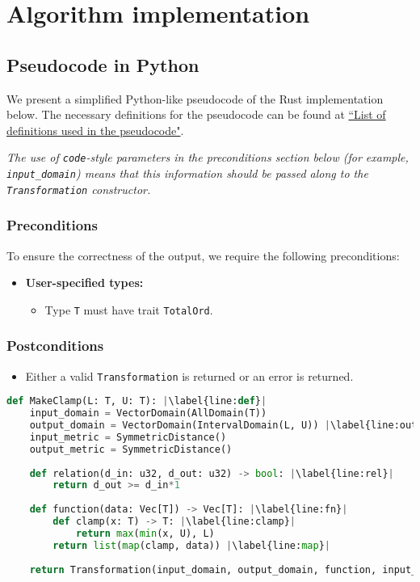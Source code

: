 \section{Algorithm implementation}

\subsection{Pseudocode in Python}\label{sec:pseudocode}
We present a simplified Python-like pseudocode of the Rust implementation below. The necessary definitions for the pseudocode can be found at \href{https://www.overleaf.com/project/60d215bf90b337ac02200a99}{``List of definitions used in the pseudocode"}. 

\emph{The use of \texttt{code}-style parameters in the preconditions section below (for example, \texttt{input\_domain}) means that this information should be passed along to the \texttt{Transformation} constructor.}

\subsubsection*{Preconditions}
To ensure the correctness of the output, we require the following preconditions:

\begin{itemize}
    \item \textbf{User-specified types:}
    \begin{itemize}
        \item Type \texttt{T} must have trait \texttt{TotalOrd}.
    \end{itemize}
\end{itemize}

\subsubsection*{Postconditions}
\begin{itemize}
    \item Either a valid \texttt{Transformation} is returned or an error is returned.
\end{itemize}

\begin{lstlisting}[language=Python, escapechar=|] 
def MakeClamp(L: T, U: T): |\label{line:def}|
    input_domain = VectorDomain(AllDomain(T))
    output_domain = VectorDomain(IntervalDomain(L, U)) |\label{line:output}|
    input_metric = SymmetricDistance()
    output_metric = SymmetricDistance()
    
    def relation(d_in: u32, d_out: u32) -> bool: |\label{line:rel}|
        return d_out >= d_in*1
    
    def function(data: Vec[T]) -> Vec[T]: |\label{line:fn}|
        def clamp(x: T) -> T: |\label{line:clamp}|
            return max(min(x, U), L)
        return list(map(clamp, data)) |\label{line:map}|
    
    return Transformation(input_domain, output_domain, function, input_metric, output_metric, stability_relation = relation)
\end{lstlisting}



